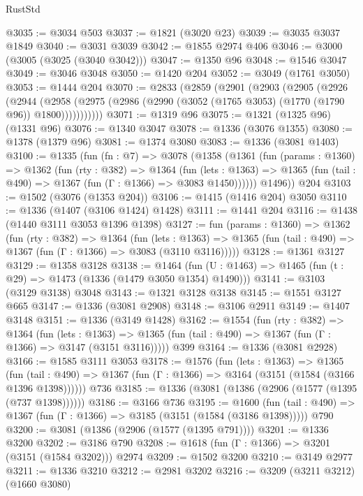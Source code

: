 \begin{lexlean}{RustStd}
\begin{coremodule}
@3035 := @3034 @503
@3037 := @1821 (@3020 @23)
@3039 := @3035 @3037 @1849
@3040 := @3031 @3039
@3042 := @1855 @2974 @406
@3046 := @3000 (@3005 (@3025 (@3040 @3042)))
@3047 := @1350 @96
@3048 := @1546 @3047
@3049 := @3046 @3048
@3050 := @1420 @204
@3052 := @3049 (@1761 @3050)
@3053 := @1444 @204
@3070 := @2833
    (@2859
      (@2901
        (@2903
          (@2905
            (@2926
              (@2944
                (@2958
                  (@2975 (@2986 (@2990 (@3052 (@1765 @3053) (@1770 (@1790 @96)) @1800)))))))))))
@3071 := @1319 @96
@3075 := @1321 (@1325 @96) (@1331 @96)
@3076 := @1340 @3047
@3078 := @1336 (@3076 @1355)
@3080 := @1378 (@1379 @96)
@3081 := @1374 @3080
@3083 := @1336 (@3081 @1403)
@3100 := @1335
    (fun (fn : @7) =>
    @3078
      (@1358
        (@1361
          (fun (params : @1360) =>
          @1362
            (fun (rty : @382) =>
            @1364
              (fun (lets : @1363) =>
              @1365 (fun (tail : @490) => @1367 (fun (Γ : @1366) => @3083 @1450))))))
        @1496))
    @204
@3103 := @1502 (@3076 (@1353 @204))
@3106 := @1415 (@1416 @204) @3050
@3110 := @1336 (@1407 (@3106 @1424) @1428)
@3111 := @1441 @204
@3116 := @1438 (@1440 @3111 @3053 @1396 @1398)
@3127 := fun (params : @1360) =>
  @1362
    (fun (rty : @382) =>
    @1364
      (fun (lets : @1363) =>
      @1365 (fun (tail : @490) => @1367 (fun (Γ : @1366) => @3083 (@3110 @3116)))))
@3128 := @1361 @3127
@3129 := @1358 @3128
@3138 := @1464 (fun (U : @1463) => @1465 (fun (t : @29) => @1473 (@1336 (@1479 @3050 @1354) @1490)))
@3141 := @3103 (@3129 @3138) @3048
@3143 := @1321 @3128 @3138
@3145 := @1551 @3127 @665
@3147 := @1336 (@3081 @2908)
@3148 := @3106 @2911
@3149 := @1407 @3148
@3151 := @1336 (@3149 @1428)
@3162 := @1554
    (fun (rty : @382) =>
    @1364
      (fun (lets : @1363) =>
      @1365 (fun (tail : @490) => @1367 (fun (Γ : @1366) => @3147 (@3151 @3116)))))
    @399
@3164 := @1336 (@3081 @2928)
@3166 := @1585 @3111 @3053
@3178 := @1576
    (fun (lets : @1363) =>
    @1365
      (fun (tail : @490) => @1367 (fun (Γ : @1366) => @3164 (@3151 (@1584 (@3166 @1396 @1398))))))
    @736
@3185 := @1336 (@3081 (@1386 (@2906 (@1577 (@1395 (@737 @1398))))))
@3186 := @3166 @736
@3195 := @1600
    (fun (tail : @490) => @1367 (fun (Γ : @1366) => @3185 (@3151 (@1584 (@3186 @1398)))))
    @790
@3200 := @3081 (@1386 (@2906 (@1577 (@1395 @791))))
@3201 := @1336 @3200
@3202 := @3186 @790
@3208 := @1618 (fun (Γ : @1366) => @3201 (@3151 (@1584 @3202))) @2974
@3209 := @1502 @3200
@3210 := @3149 @2977
@3211 := @1336 @3210
@3212 := @2981 @3202
@3216 := @3209 (@3211 @3212) (@1660 @3080)

\end{coremodule}
\end{lexlean}
